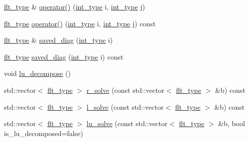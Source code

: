 \begin{DoxyCompactItemize}
\item 
\hyperlink{lib_2IceBRG__main_2common_8h_ad0f130a56eeb944d9ef2692ee881ecc4}{flt\+\_\+type} \& \hyperlink{classtk_1_1band__matrix_a3649997a5269e71326957f37ea57edec}{operator()} (\hyperlink{lib_2IceBRG__main_2common_8h_ac4de9d9335536ac22821171deec8d39e}{int\+\_\+type} i, \hyperlink{lib_2IceBRG__main_2common_8h_ac4de9d9335536ac22821171deec8d39e}{int\+\_\+type} j)
\item 
\hyperlink{lib_2IceBRG__main_2common_8h_ad0f130a56eeb944d9ef2692ee881ecc4}{flt\+\_\+type} \hyperlink{classtk_1_1band__matrix_a661aa4b55f5d1aab75acf4fc6b47b961}{operator()} (\hyperlink{lib_2IceBRG__main_2common_8h_ac4de9d9335536ac22821171deec8d39e}{int\+\_\+type} i, \hyperlink{lib_2IceBRG__main_2common_8h_ac4de9d9335536ac22821171deec8d39e}{int\+\_\+type} j) const 
\item 
\hyperlink{lib_2IceBRG__main_2common_8h_ad0f130a56eeb944d9ef2692ee881ecc4}{flt\+\_\+type} \& \hyperlink{classtk_1_1band__matrix_aef88622f8ed1de988f627f77272a9814}{saved\+\_\+diag} (\hyperlink{lib_2IceBRG__main_2common_8h_ac4de9d9335536ac22821171deec8d39e}{int\+\_\+type} i)
\item 
\hyperlink{lib_2IceBRG__main_2common_8h_ad0f130a56eeb944d9ef2692ee881ecc4}{flt\+\_\+type} \hyperlink{classtk_1_1band__matrix_ab9d4e9df93a6755858374301ba44174c}{saved\+\_\+diag} (\hyperlink{lib_2IceBRG__main_2common_8h_ac4de9d9335536ac22821171deec8d39e}{int\+\_\+type} i) const 
\item 
void \hyperlink{classtk_1_1band__matrix_a58c5621f3a2b81621b8a52d2e7fd2da5}{lu\+\_\+decompose} ()
\item 
std\+::vector$<$ \hyperlink{lib_2IceBRG__main_2common_8h_ad0f130a56eeb944d9ef2692ee881ecc4}{flt\+\_\+type} $>$ \hyperlink{classtk_1_1band__matrix_a3626d6f87f19035b6c8732fb1cebb3b4}{r\+\_\+solve} (const std\+::vector$<$ \hyperlink{lib_2IceBRG__main_2common_8h_ad0f130a56eeb944d9ef2692ee881ecc4}{flt\+\_\+type} $>$ \&b) const 
\item 
std\+::vector$<$ \hyperlink{lib_2IceBRG__main_2common_8h_ad0f130a56eeb944d9ef2692ee881ecc4}{flt\+\_\+type} $>$ \hyperlink{classtk_1_1band__matrix_a0721ac3418dd32ad416fa7bac68ced0e}{l\+\_\+solve} (const std\+::vector$<$ \hyperlink{lib_2IceBRG__main_2common_8h_ad0f130a56eeb944d9ef2692ee881ecc4}{flt\+\_\+type} $>$ \&b) const 
\item 
std\+::vector$<$ \hyperlink{lib_2IceBRG__main_2common_8h_ad0f130a56eeb944d9ef2692ee881ecc4}{flt\+\_\+type} $>$ \hyperlink{classtk_1_1band__matrix_acdf1bef7330c077929e5c414b002fa83}{lu\+\_\+solve} (const std\+::vector$<$ \hyperlink{lib_2IceBRG__main_2common_8h_ad0f130a56eeb944d9ef2692ee881ecc4}{flt\+\_\+type} $>$ \&b, bool is\+\_\+lu\+\_\+decomposed=false)
\end{DoxyCompactItemize}


